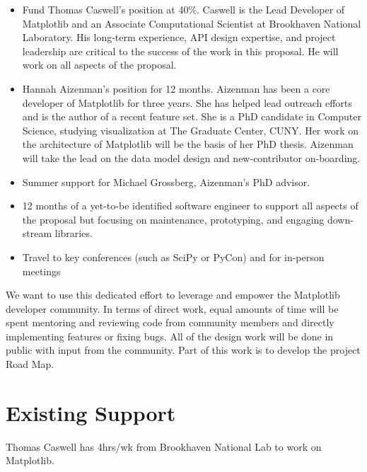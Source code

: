 \documentclass[12pt,letterpaper]{article}  %
\begin{document}
\begin{itemize}[noitemsep]

\item Fund Thomas Caswell's position at 40\%.  Caswell is the Lead Developer of Matplotlib and an Associate
  Computational Scientist at Brookhaven National Laboratory.  His
  long-term experience, API design expertise, and project leadership
  are critical to the success of the work in this proposal.  He will work
  on all aspects of the proposal.
\item Hannah Aizenman's position for 12 months.  Aizenman has
  been a core developer of Matplotlib for three years. She has helped
  lead outreach efforts and is the author of a recent feature set.
  She is a PhD candidate in Computer Science, studying visualization at The
  Graduate Center, CUNY. Her work on the architecture of Matplotlib will be
  the basis of her PhD thesis. Aizenman will take
  the lead on the data model design and new-contributor on-boarding.
\item Summer support for Michael Grossberg, Aizenman's PhD advisor.
\item 12 months of a yet-to-be identified software engineer to support all aspects of the proposal but focusing on maintenance, prototyping, and engaging down-stream libraries.
\item Travel to key conferences (such as SciPy or PyCon) and for in-person meetings
\end{itemize}

We want to use this dedicated effort to leverage and empower the Matplotlib developer community.  In terms of direct work, equal amounts of time will be spent mentoring and reviewing code from community members and directly implementing features or fixing bugs.  All of the design work will be done in public with
input from the community. Part of this work is to develop the project Road Map.



\section{Existing Support}
Thomas Caswell has 4hrs/wk from Brookhaven National Lab to work on Matplotlib.


\clearpage

\end{document}
